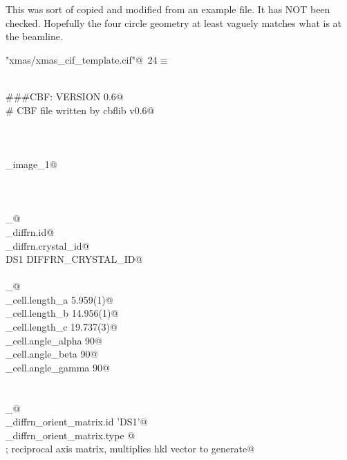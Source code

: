 \documentclass[10pt,a4paper,twoside,notitlepage]{article}
\begin{document}
This was sort of copied and modified from an example file. It has NOT been checked.
Hopefully the four circle geometry at least vaguely matches what is at the beamline.

\begin{flushleft} \small
\begin{minipage}{\linewidth}\label{scrap20}\raggedright\small
{} \verb@"xmas/xmas_cif_template.cif"@\nobreak\ {\footnotesize {24}}$\equiv$
\vspace{-1ex}
\begin{list}{}{} \item
\mbox{}\verb@@\\
\mbox{}\verb@###CBF: VERSION 0.6@\\
\mbox{}\verb@# CBF file written by cbflib v0.6@\\
\mbox{}\verb@@\\
\mbox{}\verb@@\\
\mbox{}\verb@@\\
\mbox{}\verb@data_image_1@\\
\mbox{}\verb@@\\
\mbox{}\verb@@\\
\mbox{}\verb@@\\
\mbox{}\verb@loop_@\\
\mbox{}\verb@_diffrn.id@\\
\mbox{}\verb@_diffrn.crystal_id@\\
\mbox{}\verb@ DS1 DIFFRN_CRYSTAL_ID@\\
\mbox{}\verb@@\\
\mbox{}\verb@loop_@\\
\mbox{}\verb@_cell.length_a                     5.959(1)@\\
\mbox{}\verb@_cell.length_b                     14.956(1)@\\
\mbox{}\verb@_cell.length_c                     19.737(3)@\\
\mbox{}\verb@_cell.angle_alpha                  90@\\
\mbox{}\verb@_cell.angle_beta                   90@\\
\mbox{}\verb@_cell.angle_gamma                  90@\\
\mbox{}\verb@@\\
\mbox{}\verb@@\\
\mbox{}\verb@loop_@\\
\mbox{}\verb@_diffrn_orient_matrix.id 'DS1'@\\
\mbox{}\verb@_diffrn_orient_matrix.type @\\
\mbox{}\verb@; reciprocal axis matrix, multiplies hkl vector to generate@\\

\end{list}
\end{minipage}
\end{flushleft}
\end{document}
